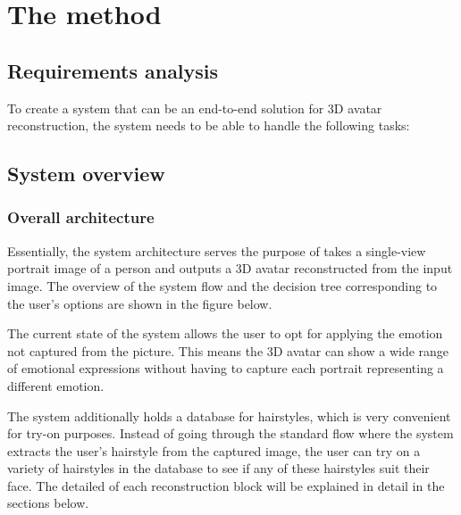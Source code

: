 \section{The method}
\label{sec:method}

\subsection{Requirements analysis}

To create a system that can be an end-to-end solution for 3D avatar reconstruction, the system needs to be able to handle the following tasks:



\subsection{System overview}

\subsubsection{Overall architecture}

Essentially, the system architecture serves the purpose of takes a single-view portrait image of a person and outputs a 3D avatar reconstructed from the input image. The overview of the system flow and the decision tree corresponding to the user's options are shown in the figure below.


The current state of the system allows the user to opt for applying the emotion not captured from the picture. This means the 3D avatar can show a wide range of emotional expressions without having to capture each portrait representing a different emotion.

The system additionally holds a database for hairstyles, which is very convenient for try-on purposes. Instead of going through the standard flow where the system extracts the user's hairstyle from the captured image, the user can try on a variety of hairstyles in the database to see if any of these hairstyles suit their face. The detailed of each reconstruction block will be explained in detail in the sections below.


